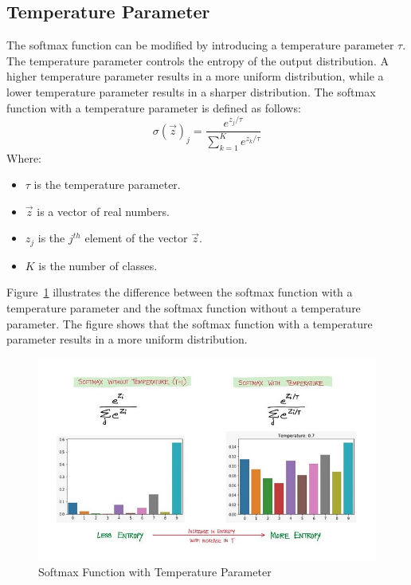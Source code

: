 \subsection{Temperature Parameter}
The softmax function can be modified by introducing a temperature parameter $\tau$. The temperature parameter controls the entropy of the output distribution. A higher temperature parameter results in a more uniform distribution, while a lower temperature parameter results in a sharper distribution. The softmax function with a temperature parameter is defined as follows:
\begin{equation}
    \sigma(\vec{z})_j = \frac{e^{z_j/\tau}}{\sum_{k=1}^{K} e^{z_k/\tau}}
\end{equation}
Where:
\begin{itemize}[noitemsep]
    \item $\tau$ is the temperature parameter.
    \item $\vec{z}$ is a vector of real numbers.
    \item $z_j$ is the $j^{th}$ element of the vector $\vec{z}$.
    \item $K$ is the number of classes.
\end{itemize}
Figure~\ref{fig:softmax_temperature} illustrates the difference between the softmax function with a temperature parameter and the softmax function without a temperature parameter. The figure shows that the softmax function with a temperature parameter results in a more uniform distribution.

\begin{figure}[H]
    \centering
    \includegraphics[width=\textwidth]{assets/0_7xj72SjtNHvCMQlV.jpg}
    \caption[Softmax Function with Temperature Parameter]{Softmax Function with Temperature Parameter  \cite{Medium}}
    \label{fig:softmax_temperature}
\end{figure}

